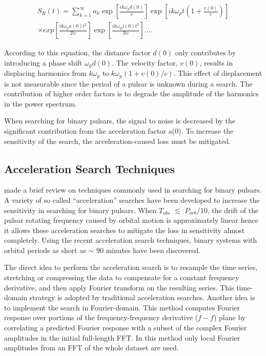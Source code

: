 \documentclass[preprint2]{aastex}
\begin{document}
\begin{eqnarray}
\nonumber S_R(t)=\sum_{k=1}^{\infty}a_k \exp[\frac{ik\omega_pd(0)}{c}]\exp[ik\omega_pt(1+\frac{v(0)}{c})]\\
\times exp[\frac{ik\omega_pa(0)t^2}{2! c}]\exp[\frac{ik\omega_pj(0)t^3}{3! c}]\ldots.
\end{eqnarray}

According to this equation, the distance factor $d(0)$ only contributes by  introducing a phase shift $\omega_pd(0)$.
The velocity factor, $v(0)$, results in 
displacing harmonics from $k\omega_p$ to $k\omega_p(1+v(0)/c)$. This effect of displacement is not measurable 
since the period of a pulsar is unknown during a search.
The contribution of higher order factors is to degrade the amplitude of the harmonics 
in the power spectrum. 

When searching for binary pulsars, the signal to noise is decreased by the significant contribution from the 
acceleration factor a(0). To increase the sensitivity of the search, the acceleration-caused loss must be mitigated.

\subsection{Acceleration Search Techniques}
\citet{eat09} made a brief review on techniques commonly used in searching for binary pulsars.
A variety of so called ``acceleration'' searches have been developed to increase 
the sensitivity in searching for binary pulsars. When $T_{obs}$ $\lesssim$ 
$P_{orb}/10$, the drift of the pulsar rotating frequency caused by orbital motion 
is approximately linear hence it allows these acceleration searches to mitigate the 
loss in sensitivity almost completely. Using the recent acceleration search techniques,
binary systems with orbital periods as short as $\sim$ 90 
minutes have been discovered\citep{ran03}.
 
The direct idea to perform the acceleration search is to resample the time series, 
stretching or compressing the data to compensate for a constant frequency derivative, 
and then apply Fourier transform on the resulting series. This time-domain strategy 
is adopted by traditional acceleration searches. Another idea is to implement the
search in Fourier-domain. This method computes Fourier 
response over portions of the frequency-frequency derivative ($f-\dot{f}$) plane by
correlating a predicted Fourier response with a subset of the complex 
Fourier amplitudes in the initial full-length FFT. In this method only local Fourier amplitudes 
from an FFT of the whole dataset are used. 
\end{document}
